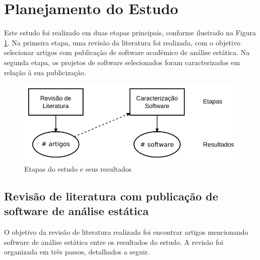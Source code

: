 
\section{Planejamento do Estudo} \label{estudo1:planejamento} %

Este estudo foi realizado em duas etapas principais, conforme ilustrado na
Figura \ref{estudo1-etapas}. Na primeira etapa, uma revisão da literatura
foi realizada, com o objetivo selecionar
artigos com publicação de software acadêmico de análise estática. 
Na segunda etapa, os projetos de software selecionados foram caracterizados
em relação à sua publicização.

\begin{figure}[h]
  \center
  \includegraphics[scale=0.4]{imagens/estudo1-etapas.png}
  \caption{Etapas do estudo e seus resultados}
  \label{estudo1-etapas}
\end{figure}

\subsection{Revisão de literatura com publicação de software de análise estática}

O objetivo da revisão de literatura realizada foi encontrar artigos mencionando
software de análise estática entre os resultados do estudo. A revisão foi
organizada em três passos, detalhados a seguir.

